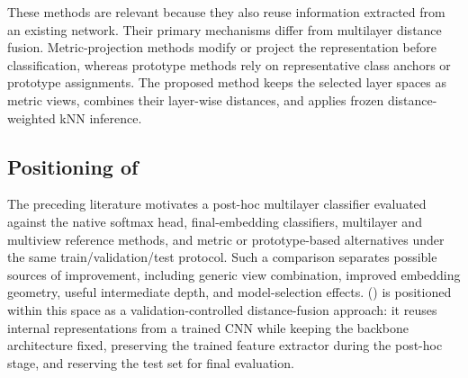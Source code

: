 \documentclass[main.tex]{subfiles}
\begin{document}
These methods are relevant because they also reuse information extracted from an existing network. Their primary mechanisms differ from multilayer distance fusion. Metric-projection methods modify or project the representation before classification, whereas prototype methods rely on representative class anchors or prototype assignments. The proposed method keeps the selected layer spaces as metric views, combines their layer-wise distances, and applies frozen distance-weighted kNN inference.

\subsection{Positioning of \method{}}

The preceding literature motivates a post-hoc multilayer classifier evaluated against the native softmax head, final-embedding classifiers, multilayer and multiview reference methods, and metric or prototype-based alternatives under the same train/validation/test protocol. Such a comparison separates possible sources of improvement, including generic view combination, improved embedding geometry, useful intermediate depth, and model-selection effects. \fullmethod{} (\method{}) is positioned within this space as a validation-controlled distance-fusion approach: it reuses internal representations from a trained CNN while keeping the backbone architecture fixed, preserving the trained feature extractor during the post-hoc stage, and reserving the test set for final evaluation.
\end{document}
